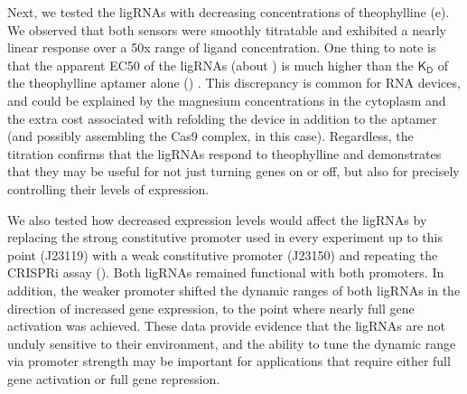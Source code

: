 \documentclass[10pt,oneside]{article}
\begin{document}


Next, we tested the ligRNAs with decreasing concentrations of theophylline (e).  We observed that both sensors were smoothly titratable and exhibited a nearly linear response over a 50x range of ligand concentration.  One thing to note is that the apparent EC50 of the ligRNAs (about ) is much higher than the $\mathsf{K_D}$ of the theophylline aptamer alone () \autocite{jenison1994}.  This discrepancy is common for RNA devices, and could be explained by the magnesium concentrations in the cytoplasm \autocite{carothers2010} and the extra cost associated with refolding the device in addition to the aptamer (and possibly assembling the Cas9 complex, in this case).  Regardless, the titration confirms that the ligRNAs respond to theophylline and demonstrates that they may be useful for not just turning genes on or off, but also for precisely controlling their levels of expression.
% 
% 
% 
%


We also tested how decreased expression levels would affect the ligRNAs by replacing the strong constitutive promoter used in every experiment up to this point (J23119) with a weak constitutive promoter (J23150) and repeating the CRISPRi assay ().  Both ligRNAs remained functional with both promoters.  In addition, the weaker promoter shifted the dynamic ranges of both ligRNAs in the direction of increased gene expression, to the point where nearly full gene activation was achieved.  These data provide evidence that the ligRNAs are not unduly sensitive to their environment, and the ability to tune the dynamic range via promoter strength may be important for applications that require either full gene activation or full gene repression.

\end{document}
